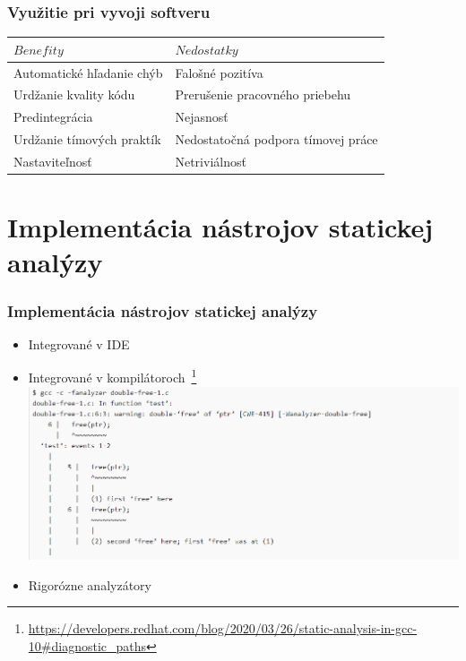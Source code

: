 \documentclass{beamer}
\newcommand{\footcite}[1]{\footnote{\tiny #1}}
\begin{document}
\begin{frame}[fragile=singleslide]\frametitle{Využitie pri vyvoji softveru}

	\begin{table}
		\begin{center}
			\begin{tabular}{l|l}
				$Benefity$                & $Nedostatky$                       \\
				\hline
				Automatické hľadanie chýb & Falošné pozitíva                   \\
				Urdžanie kvality kódu     & Prerušenie pracovného priebehu     \\
				Predintegrácia            & Nejasnosť                          \\
				Urdžanie tímových praktík & Nedostatočná podpora tímovej práce \\
				Nastaviteľnosť            & Netriviálnosť                      \\
			\end{tabular}
		\end{center}
	\end{table}

\end{frame}

\section{Implementácia nástrojov statickej analýzy}

\begin{frame}[fragile=singleslide]\frametitle{Implementácia nástrojov statickej analýzy}
	\begin{itemize}
		\item Integrované v IDE
		\item Integrované v kompilátoroch~\footcite{\url{https://developers.redhat.com/blog/2020/03/26/static-analysis-in-gcc-10\#diagnostic_paths}}
		      \includegraphics[scale=0.35]{SAkompiler.png}
		\item Rigorózne analyzátory
	\end{itemize}
\end{frame}
\end{document}
